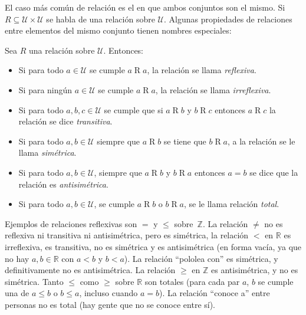  El caso más común de relación es el en que ambos conjuntos son el mismo.
  Si \(R \subseteq \mathcal{U} \times \mathcal{U}\)
  se habla de una relación sobre \(\mathcal{U}\).
  Algunas propiedades de relaciones entre elementos del mismo conjunto
  tienen nombres especiales:
  \begin{definition}
    Sea \(R\) una relación sobre \(\mathcal{U}\).
    Entonces:
    \begin{itemize}
    \item
      Si para todo \(a \in \mathcal{U}\) se cumple \(a \mathrel{R} a\),
      la relación se llama \emph{reflexiva}.
    \item
      Si para ningún \(a \in \mathcal{U}\) se cumple \(a \mathrel{R} a\),
      la relación se llama \emph{irreflexiva}.
    \item
      Si para todo \(a, b, c \in \mathcal{U}\)
      se cumple que si \(a \mathrel{R} b\)
      y \(b \mathrel{R} c\) entonces \(a \mathrel{R} c\)
      la relación se dice \emph{transitiva}.
    \item
      Si para todo \(a, b \in \mathcal{U}\)
      siempre que \(a \mathrel{R} b\) se tiene que \(b \mathrel{R} a\),
      a la relación se le llama \emph{simétrica}.
    \item
      Si para todo \(a, b \in \mathcal{U}\),
      siempre que \(a \mathrel{R} b\)
      y \(b \mathrel{R} a\) entonces \(a = b\)
      se dice que la relación es \emph{antisimétrica}.
    \item
      Si para todo \(a, b \in \mathcal{U}\),
      se cumple \(a \mathrel{R} b\) o \(b \mathrel{R} a\),
      se le llama relación \emph{total}.
    \end{itemize}
  \end{definition}
  Ejemplos de relaciones reflexivas son \(=\) y \(\le\) sobre~\(\mathbb{Z}\).
  La relación \(\ne\) no es reflexiva ni transitiva ni antisimétrica,
  pero es simétrica,
  la relación \(<\) en \(\mathbb{R}\) es irreflexiva,
  es transitiva,
  no es simétrica y es antisimétrica
  (en forma vacía,
   ya que no hay \(a, b \in \mathbb{R}\) con \(a < b\) y \(b < a\)).
  La relación ``pololea con'' es simétrica,
  y definitivamente no es antisimétrica.
  La relación \(\ge\) en \(\mathbb{Z}\) es antisimétrica,
  y no es simétrica.
  Tanto \(\le\) como \(\ge\) sobre \(\mathbb{R}\) son totales
  (para cada par \(a\), \(b\)
   se cumple una de \(a \le b\) o \(b \le a\),
   incluso cuando \(a = b\)).
  La relación ``conoce a'' entre personas no es total
  (hay gente que no se conoce entre sí).


